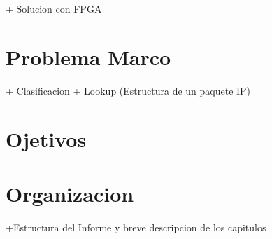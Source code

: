 + Solucion con FPGA

\section{Problema Marco}

+ Clasificacion
+ Lookup (Estructura de un paquete IP)

\section{Ojetivos}
\section{Organizacion}
+Estructura del Informe y breve descripcion de los capitulos





